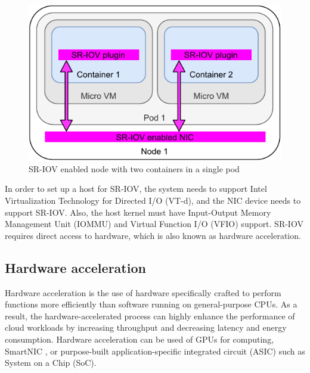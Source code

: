 \begin{figure}[ht]
  \begin{center}
    \includegraphics[width=13.5cm]{images/SR-IOVNode.pdf}
    \caption{SR-IOV enabled node with two containers in a single pod}
    \label{fig:SR-IOVNode}
  \end{center}
\end{figure}

In order to set up a host for SR-IOV, the system needs to support Intel Virtualization Technology for Directed I/O (VT-d), and the NIC device needs to support SR-IOV. Also, the host kernel must have Input-Output Memory Management Unit (IOMMU) and Virtual Function I/O (VFIO) support. SR-IOV requires direct access to hardware, which is also known as hardware acceleration.

\subsection{Hardware acceleration}

Hardware acceleration is the use of hardware specifically crafted to perform functions more efficiently than software running on general-purpose CPUs. As a result, the hardware-accelerated process can highly enhance the performance of cloud workloads by increasing throughput and decreasing latency and energy consumption. Hardware acceleration can be used of GPUs for computing, SmartNIC \cite{SmartNICIntel}, or purpose-built application-specific integrated circuit (ASIC) such as System on a Chip (SoC).


